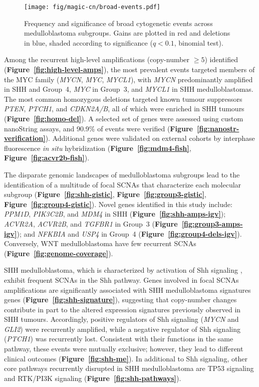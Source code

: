 \documentclass[11pt,letterpaper]{article}
\theoremstyle{definition}
\newcommand{\emphlab}[1]{\textbf{\textsf{#1}}}
\newcommand{\citefig}[1]{\emphlab{Figure~\ref{fig:#1}}}
\begin{document}
\begin{SCfigure}[5][b]
	\centering
	\texttt{[image: fig/magic-cn/broad-events.pdf]}
	\caption[Frequency and significance of broad cytogenetic events]
	{
	Frequency and significance of broad cytogenetic events across medulloblastoma subgroups.
	Gains are plotted in red and deletions in blue, shaded according to significance ($q < 0.1$, binomial test).
	}
	\label{fig:broad-events}
\end{SCfigure} 

Among the recurrent high-level amplifications (copy-number $\geq 5$) identified (\citefig{high-level-amps}), the most prevalent events targeted members of the MYC family (\emph{MYCN}, \emph{MYC}, \emph{MYCL1}), with \emph{MYCN} predominantly amplified in SHH and Group~4, \emph{MYC} in Group~3, and \emph{MYCL1} in SHH medulloblastomas.
The most common homozygous deletions targeted known tumour suppressors \emph{PTEN}, \emph{PTCH1}, and \emph{CDKN2A/B}, all of which were enriched in SHH tumours (\citefig{homo-del}). A selected set of genes were assessed using custom nanoString assays, and 90.9\% of events were verified (\citefig{nanostr-verification}). Additional genes were validated on external cohorts by interphase fluorescence \emph{in situ} hybridization (\citefig{mdm4-fish}, \citefig{acvr2b-fish}).

The disparate genomic landscapes of medulloblastoma subgroups lead to the identification of a multitude of focal SCNAs that characterize each molecular subgroup (\citefig{shh-gistic}, \citefig{group3-gistic}, \citefig{group4-gistic}). Novel genes identified in this study include: \emph{PPM1D}, \emph{PIK3C2B}, and \emph{MDM4} in SHH (\citefig{shh-amps-igv}); \emph{ACVR2A}, \emph{ACVR2B}, and \emph{TGFBR1} in Group~3 (\citefig{group3-amps-igv}); and \emph{NFKBIA} and \emph{USP4} in Group~4 (\citefig{group4-dels-igv}). Conversely, WNT medulloblastoma have few recurrent SCNAs (\citefig{genome-coverage}). 

SHH medulloblastoma, which is characterized by activation of Shh signaling , exhibit frequent SCNAs in the Shh pathway. Genes involved in focal SCNAs amplifications are significantly associated with SHH medulloblastoma signatures genes (\citefig{shh-signature}), suggesting that copy-number changes contribute in part to the altered expression signatures previously observed in SHH tumours. Accordingly, positive regulators of Shh signaling (\emph{MYCN} and \emph{GLI2}) were recurrently amplified, while a negative regulator of Shh signaling (\emph{PTCH1}) was recurrently lost. Consistent with their functions in the same pathway, these events were mutually exclusive; however, they lead to different clinical outcomes (\citefig{shh-me}). In additional to Shh signaling, other core pathways recurrently disrupted in SHH medulloblastoma are TP53 signaling and RTK/PI3K signaling (\citefig{shh-pathways}).
\end{document}
